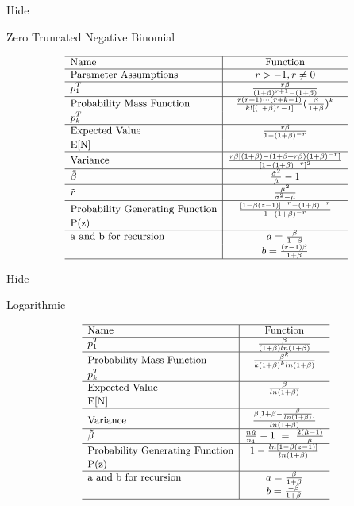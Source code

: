 \documentclass[]{book}
\begin{document}
\hypertarget{ztD}{}
{Hide}

Zero Truncated Negative Binomial

\[
{\small
\begin{matrix}
\begin{array}{l|c}
\hline
  \text{Name} & \text{Function} \\
\hline
  \text{Parameter Assumptions} & r>-1, r\neq0 \\
\hline
  p^T_1 & \frac{r\beta}{(1+\beta)^{r+1}-(1+\beta)} \\
\hline
  \text{Probability Mass Function} & \frac{r(r+1)\cdots(r+k-1)}{k![(1+\beta)^r-1]}(\frac{\beta}{1+\beta})^k \\
  p^T_k & \\
\hline
  \text{Expected Value} & \frac{r\beta}{1-(1+\beta)^{-r}} \\
  \mathrm{E[N]} & \\
\hline
  \text{Variance} & \frac{r\beta[(1+\beta)-(1+\beta+r\beta)(1+\beta)^{-r}]}{[1-(1+\beta)^{-r}]^2} \\
\hline
  \tilde\beta & \frac{\hat\sigma^2}{\hat\mu}-1 \\
\hline
  \tilde r & \frac{\hat\mu^2}{\hat\sigma^2-\hat\mu} \\
\hline
  \text{Probability Generating Function} & \frac{[1-\beta(z-1)]^{-r}-(1+\beta)^{-r}}{1-(1+\beta)^{-r}} \\
  \mathrm{P(z)} & \\
\hline
  \text{a and b for recursion} & a=\frac{\beta}{1+\beta} \\
   & b=\frac{(r-1)\beta}{1+\beta} \\
\hline
\end{array}
\end{matrix}
}
\]

\hypertarget{ztE}{}
{Hide}

Logarithmic

\[
{\small
\begin{matrix}
\begin{array}{l|c}
\hline
  \text{Name} & \text{Function} \\
\hline
  p^T_1 & \frac{\beta}{(1+\beta)ln(1+\beta)} \\
\hline
  \text{Probability Mass Function} & \frac{\beta^k}{k(1+\beta)^k ln(1+\beta)} \\
  p^T_k & \\
\hline
  \text{Expected Value} & \frac{\beta}{ln(1+\beta)} \\
  \mathrm{E[N]} & \\
\hline
  \text{Variance} & \frac{\beta[1+\beta-\frac{\beta}{ln(1+\beta)}]}{ln(1+\beta)} \\
\hline
  \tilde\beta & \frac{n\hat\mu}{n_1}-1~=~ \frac{2(\hat\mu-1)}{\hat\mu} \\
\hline
  \text{Probability Generating Function} & 1-\frac{ln[1-\beta(z-1)]}{ln(1+\beta)} \\
  \mathrm{P(z)} & \\
\hline
  \text{a and b for recursion} & a=\frac{\beta}{1+\beta} \\
   & b=\frac{-\beta}{1+\beta} \\
\hline
\end{array}
\end{matrix}
}
\]


\end{document}
